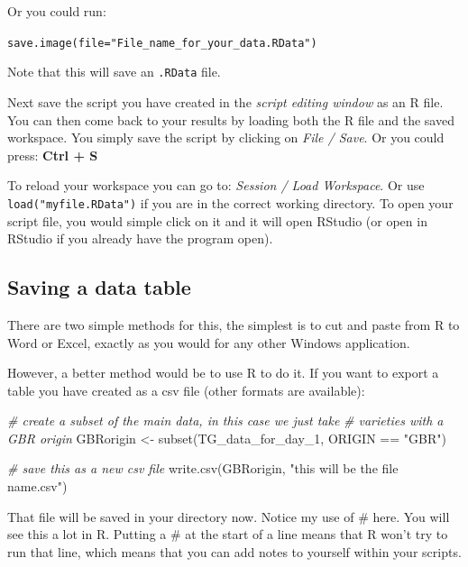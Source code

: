 \documentclass[
]{book}
\makeatletter
\newenvironment{Shaded}{\begin{snugshade}}{\end{snugshade}}
\newcommand{\CommentTok}[1]{\textcolor[rgb]{0.56,0.35,0.01}{\textit{#1}}}
\newcommand{\FunctionTok}[1]{\textcolor[rgb]{0.00,0.00,0.00}{#1}}
\newcommand{\NormalTok}[1]{#1}
\newcommand{\OtherTok}[1]{\textcolor[rgb]{0.56,0.35,0.01}{#1}}
\newcommand{\SpecialCharTok}[1]{\textcolor[rgb]{0.00,0.00,0.00}{#1}}
\newcommand{\StringTok}[1]{\textcolor[rgb]{0.31,0.60,0.02}{#1}}
\newenvironment{kframe}{%
\medskip{}
\setlength{\fboxsep}{.8em}
 \def\at@end@of@kframe{}%
 \ifinner\ifhmode%
  \def\at@end@of@kframe{\end{minipage}}%
  \begin{minipage}{\columnwidth}%
 \fi\fi%
 \def\FrameCommand##1{\hskip\@totalleftmargin \hskip-\fboxsep
 \colorbox{shadecolor}{##1}\hskip-\fboxsep
     \hskip-\linewidth \hskip-\@totalleftmargin \hskip\columnwidth}%
 \MakeFramed {\advance\hsize-\width
   \@totalleftmargin\z@ \linewidth\hsize
   \@setminipage}}%
 {\par\unskip\endMakeFramed%
 \at@end@of@kframe}
\newenvironment{rmdblock}[1]
  {
  \begin{itemize}
  \renewcommand{\labelitemi}{
    \raisebox{-.7\height}[0pt][0pt]{
      {\setkeys{Gin}{width=3em,keepaspectratio}\texttt{[image: images/\#1]}}
    }
  }
  \setlength{\fboxsep}{1em}
  \begin{kframe}
  \item
  }
  {
  \end{kframe}
  \end{itemize}
  }
\newenvironment{rmdtip}
  {\begin{rmdblock}{tip}}
  {\end{rmdblock}}
\makeatother
\begin{document}
Or you could run:

\texttt{save.image(file="File\_name\_for\_your\_data.RData")}

Note that this will save an \texttt{.RData} file.

Next save the script you have created in the \emph{script editing window} as an R file. You can then come back to your results by loading both the R file and the saved workspace. You simply save the script by clicking on \emph{File / Save}.
Or you could press: \textbf{Ctrl + S}

To reload your workspace you can go to: \emph{Session / Load Workspace}. Or use \texttt{load("myfile.RData")} if you are in the correct working directory. To open your script file, you would simple click on it and it will open RStudio (or open in RStudio if you already have the program open).

\hypertarget{saving-a-data-table}{%
\subsection{Saving a data table}\label{saving-a-data-table}}

There are two simple methods for this, the simplest is to cut and paste from R to Word or Excel, exactly as you would for any other Windows application.

However, a better method would be to use R to do it. If you want to export a table you have created as a csv file (other formats are available):

\begin{Shaded}
\begin{Highlighting}[]
\CommentTok{\# create a subset of the main data, in this case we just take}
\CommentTok{\# varieties with a GBR origin}
\NormalTok{GBRorigin }\OtherTok{\textless{}{-}} \FunctionTok{subset}\NormalTok{(TG\_data\_for\_day\_1, ORIGIN }\SpecialCharTok{==} \StringTok{"GBR"}\NormalTok{)}

\CommentTok{\# save this as a new csv file}
\FunctionTok{write.csv}\NormalTok{(GBRorigin, }\StringTok{"this will be the file name.csv"}\NormalTok{)}
\end{Highlighting}
\end{Shaded}

\begin{rmdtip}
That file will be saved in your directory now. Notice my use of \# here. You will see this a lot in R. Putting a \# at the start of a line means that R won't try to run that line, which means that you can add notes to yourself within your scripts.
\end{rmdtip}
\end{document}
